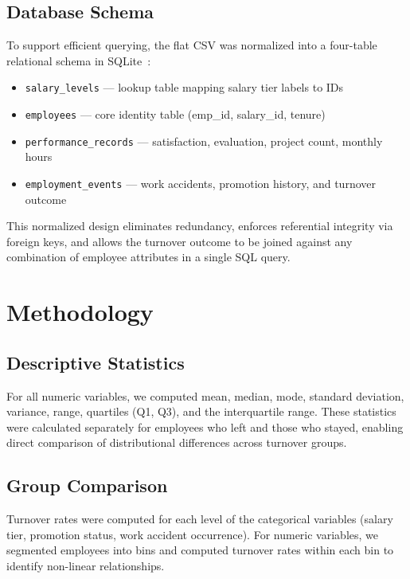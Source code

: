 \documentclass[conference]{IEEEtran}
\begin{document}
\subsection{Database Schema}

To support efficient querying, the flat CSV was normalized into a four-table
relational schema in SQLite~\cite{codd1970}:
\begin{itemize}
  \item \texttt{salary\_levels} --- lookup table mapping salary tier labels to IDs
  \item \texttt{employees} --- core identity table (emp\_id, salary\_id, tenure)
  \item \texttt{performance\_records} --- satisfaction, evaluation, project count,
        monthly hours
  \item \texttt{employment\_events} --- work accidents, promotion history, and
        turnover outcome
\end{itemize}
This normalized design eliminates redundancy, enforces referential integrity
via foreign keys, and allows the turnover outcome to be joined against any
combination of employee attributes in a single SQL query.

\section{Methodology}
\label{sec:method}

\subsection{Descriptive Statistics}

For all numeric variables, we computed mean, median, mode, standard deviation,
variance, range, quartiles (Q1, Q3), and the interquartile range. These
statistics were calculated separately for employees who left and those who
stayed, enabling direct comparison of distributional differences across
turnover groups.

\subsection{Group Comparison}

Turnover rates were computed for each level of the categorical variables
(salary tier, promotion status, work accident occurrence). For numeric
variables, we segmented employees into bins and computed turnover rates within
each bin to identify non-linear relationships.
\end{document}
